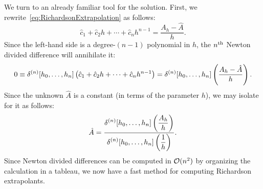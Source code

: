 We turn to an already familiar tool for the solution. First, we rewrite~\eqref{eq:RichardsonExtrapolation} as follows:
\[
\hat{c}_1 + \hat{c}_2h + \cdots + \hat{c}_nh^{n-1} = \dfrac{A_h-\hat{A}}{h}.
\]
Since the left-hand side is a degree-$(n-1)$ polynomial in $h$, the $n^{\rm th}$ Newton divided difference will annihilate it:
\[
0 \equiv \delta^{(n)}[h_0,\ldots,h_n]\pr(\hat{c}_1 + \hat{c}_2h + \cdots + \hat{c}_nh^{n-1}) = \delta^{(n)}[h_0,\ldots,h_n]\pr(\dfrac{A_h-\hat{A}}{h}).
\]
Since the unknown $\hat{A}$ is a constant (in terms of the parameter $h$), we may isolate for it as follows:
\[
\hat{A} = \dfrac{\displaystyle\delta^{(n)}[h_0,\ldots,h_n]\pr(\frac{A_h}{h})}{\displaystyle\delta^{(n)}[h_0,\ldots,h_n]\pr(\frac{1}{h})}.
\]
Since Newton divided differences can be computed in $\mathcal{O}(n^2)$ by organizing the calculation in a tableau, we now have a fast method for computing Richardson extrapolants.

